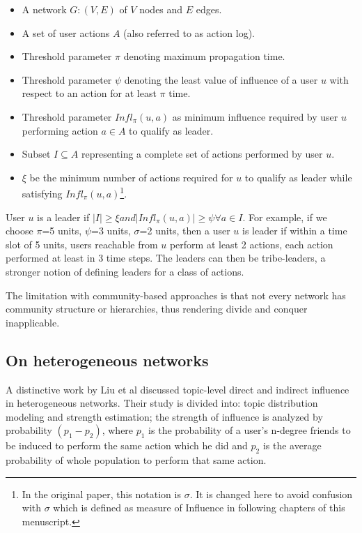 		\begin{itemize}
			\item A network $G:(V,E)$ of $V$ nodes and $E$ edges.
			
			\item A set of user actions $A$ (also referred to as action log).
			
			\item Threshold parameter $\pi$ denoting maximum propagation time. %
			
			\item Threshold parameter $\psi$ denoting the least value of influence of a user $u$ with respect to an action for at least $\pi$ time.
			
			\item Threshold parameter $Infl_\pi (u,a)$ as minimum influence required by user $u$ performing action $a\in A$ to qualify as leader.
			
			\item Subset $I\subseteq A$ representing a complete set of actions performed by user $u$.
			
			\item $\xi$ be the minimum number of actions required for $u$ to qualify as leader while satisfying $Infl_\pi (u,a)$\footnote{In the original paper, this notation is $\sigma$. It is changed here to avoid confusion with $\sigma$ which is defined as measure of Influence in following chapters of this menuscript.}.
		\end{itemize}
		
		 User $u$ is a leader if $|I|\geq \xi and |Infl_\pi (u,a)|\geq \psi \forall a\in I$. For example, if we choose $\pi$=5 units, $\psi$=3 units, $\sigma$=2 units, then a user $u$ is leader if within a time slot of 5 units, users reachable from $u$ perform at least 2 actions, each action performed at least in 3 time steps. The leaders can then be tribe-leaders, a stronger notion of defining leaders for a class of actions.

		The limitation with community-based approaches is that not every network has community structure or hierarchies, thus rendering divide and conquer inapplicable.		
		
		\subsection{On heterogeneous networks}
		A distinctive work by Liu et al \cite{liu2010} discussed topic-level direct and indirect influence in heterogeneous networks. Their study is divided into: topic distribution modeling and strength estimation; the strength of influence is analyzed by probability $(p_1-p_2)$, where $p_1$ is the probability of a user’s n-degree friends to be induced to perform the same action which he did and $p_2$ is the average probability of whole population to perform that same action.
		
